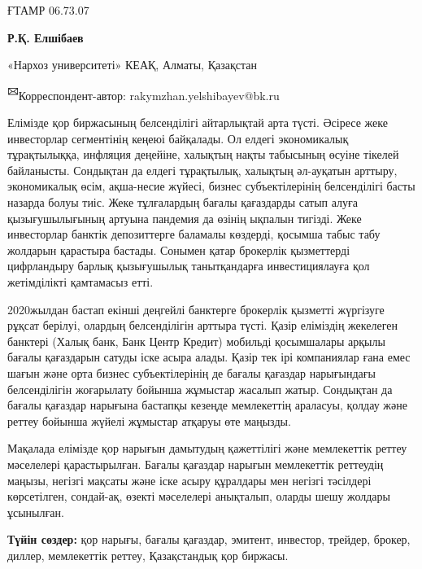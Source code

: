 \newpage
ҒТАМР 06.73.07


\begin{center}
{\bfseries Р.Қ. Елшібаев}

«Нархоз университеті» КЕАҚ, Алматы, Қазақстан
\end{center}

{\bfseries \textsuperscript{🖂}}Корреспондент-автор:
rakymzhan.yelshibayev@bk.ru

Елімізде қор биржасының белсенділігі айтарлықтай арта түсті. Әсіресе
жеке инвесторлар сегментінің кеңеюі байқалады. Ол елдегі экономикалық
тұрақтылыққа, инфляция деңейіне, халықтың нақты табысының өсуіне тікелей
байланысты. Сондықтан да елдегі тұрақтылық, халықтың әл-ауқатын арттыру,
экономикалық өсім, ақша-несие жүйесі, бизнес субъектілерінің
белсенділігі басты назарда болуы тиіс. Жеке тұлғалардың бағалы
қағаздарды сатып алуға қызығушылығының артуына пандемия да өзінің
ықпалын тигізді. Жеке инвесторлар банктік депозиттерге баламалы
көздерді, қосымша табыс табу жолдарын қарастыра бастады. Сонымен қатар
брокерлік қызметтерді цифрландыру барлық қызығушылық танытқандарға
инвестициялауға қол жетімділікті қамтамасыз етті.

2020жылдан бастап екінші деңгейлі банктерге брокерлік қызметті жүргізуге
рұқсат берілуі, олардың белсенділігін арттыра түсті. Қазір еліміздің
жекелеген банктері (Халық банк, Банк Центр Кредит) мобильді қосымшалары
арқылы бағалы қағаздарын сатуды іске асыра алады. Қазір тек ірі
компаниялар ғана емес шағын және орта бизнес субъектілерінің де бағалы
қағаздар нарығындағы белсенділігін жоғарылату бойынша жұмыстар жасалып
жатыр. Сондықтан да бағалы қағаздар нарығына бастапқы кезеңде
мемлекеттің араласуы, қолдау және реттеу бойынша жүйелі жұмыстар атқаруы
өте маңызды.

Мақалада елімізде қор нарығын дамытудың қажеттілігі және мемлекеттік
реттеу мәселелері қарастырылған. Бағалы қағаздар нарығын мемлекеттік
реттеудің маңызы, негізгі мақсаты және іске асыру құралдары мен негізгі
тәсілдері көрсетілген, сондай-ақ, өзекті мәселелері анықталып, оларды
шешу жолдары ұсынылған.

{\bfseries Түйін сөздер:} қор нарығы, бағалы қағаздар, эмитент, инвестор,
трейдер, брокер, диллер, мемлекеттік реттеу, Қазақстандық қор биржасы.


